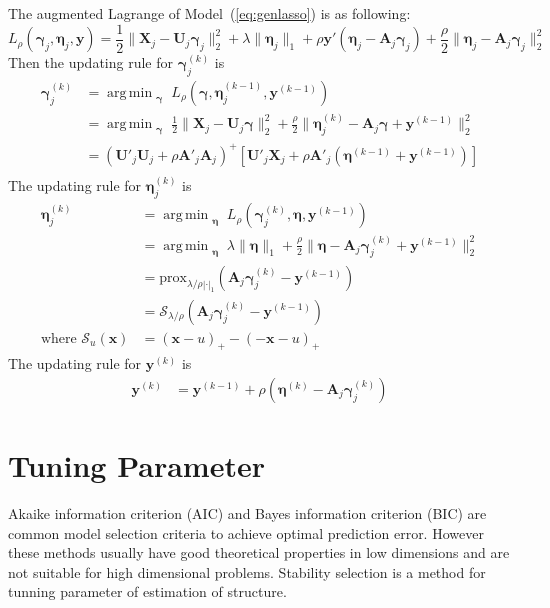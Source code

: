 \documentclass[11pt]{article}
\newcommand{\bX}{\mathbf X}
\newcommand{\bA}{\mathbf A}
\newcommand{\bU}{\mathbf U}
\newcommand{\bx}{\mathbf x}
\newcommand{\by}{\mathbf y}
\newcommand{\bdeta}{{\boldsymbol{\eta}}}
\newcommand{\bgamma}{\boldsymbol{\gamma}}
\DeclareMathOperator*{\argmin}{arg\,min}
\begin{document}
The augmented Lagrange of Model~(\ref{eq:genlasso}) is as following:
\begin{equation}
	\label{eq:lagrange}
	L_{\rho}(\bgamma_j, \bdeta_j, \by) = \frac{1}{2} \|\bX_j - \bU_j \bgamma_j \|_2^2 + \lambda \|\bdeta_j \|_1 + \rho \by'(\bdeta_j - \bA_j \bgamma_j) + \frac{\rho}{2} \|\bdeta_j - \bA_j \bgamma_j\|_2^2
\end{equation}
Then the updating rule for $\bgamma_j^{(k)}$ is
\begin{equation}
	\label{eq:update_gamma}
	\begin{aligned}
	\bgamma_j^{(k)} &= \argmin_{\substack{\bgamma}} L_{\rho}(\bgamma, \bdeta_j^{(k-1)}, \by^{(k-1)}) \\
	                &= \argmin_{\substack{\bgamma}} \frac{1}{2} \|\bX_j - \bU_j \bgamma \|_2^2  + \frac{\rho}{2} \|\bdeta_j^{(k)} - \bA_j \bgamma + \by^{(k-1)}\|_2^2\\
	                &= (\bU'_j\bU_j + \rho\bA'_j\bA_j)^{+}\left[\bU'_j\bX_j + \rho \bA'_j(\bdeta^{(k-1)} + \by^{(k-1)})\right]\\
	\end{aligned}
\end{equation}
The updating rule for $\bdeta_j^{(k)}$ is
\begin{equation}
	\label{eq:update_eta}
	\begin{aligned}
	\bdeta_j^{(k)} &= \argmin_{\substack{\bdeta}} L_{\rho}(\bgamma_j^{(k)}, \bdeta, \by^{(k-1)}) \\
	               &= \argmin_{\substack{\bdeta}} \lambda \|\bdeta \|_1  + \frac{\rho}{2} \|\bdeta - \bA_j \bgamma_j^{(k)} + \by^{(k-1)}\|_2^2\\ 
	               &= \text{prox}_{\lambda/\rho |\cdot|_1}(\bA_j \bgamma_j^{(k)} - \by^{(k-1)}) \\
	               &= \mathcal{S}_{\lambda/\rho}(\bA_j \bgamma_j^{(k)} - \by^{(k-1)}) \\
	               \text{where } \mathcal{S}_{u}(\bx) &= (\bx-u)_{+} - (-\bx - u)_{+}
	\end{aligned}
\end{equation}
The updating rule for $\by^{(k)}$ is
\begin{equation}
	\label{eq:update_y}
	\begin{aligned}
	\by^{(k)} &= \by^{(k-1)} + \rho ( \bdeta^{(k)} -\bA_j \bgamma_j^{(k)})
	\end{aligned}
\end{equation}

\section{Tuning Parameter}

Akaike information criterion (AIC) and Bayes information criterion (BIC) are common model selection criteria to achieve optimal prediction error. However these methods usually have good theoretical properties in low dimensions and are not suitable for high dimensional problems. Stability selection is a method for tunning parameter of estimation of structure. 



\end{document}
